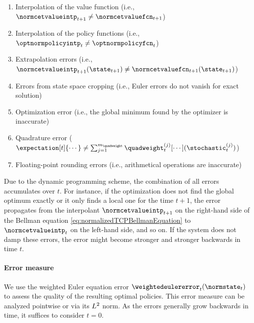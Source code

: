 \begin{enumerate}[label=E\arabic*.,ref=E\arabic*,leftmargin=2.7em]
  \item
  \label{item:financeErrorInterpolationValue}
  Interpolation of the value function
  (i.e., $\normcetvalueintp_{t+1} \not= \normcetvaluefcn_{t+1}$)
  
  \item
  \label{item:financeErrorInterpolationPolicy}
  Interpolation of the policy functions
  (i.e., $\optnormpolicyintp_t \not= \optnormpolicyfcn_t$)
  
  \item
  \label{item:financeErrorExtrapolation}
  Extrapolation errors
  (i.e., $
  \normcetvalueintp_{t+1}(\state_{t+1})
  \not= \normcetvaluefcn_{t+1}(\state_{t+1})
  $)
  
  \item
  \label{item:financeErrorCropping}
  Errors from state space cropping
  (i.e., Euler errors do not vanish for exact solution)
  
  \item
  \label{item:financeErrorOptimization}
  Optimization error
  (i.e., the global minimum found by the optimizer is inaccurate)
  
  \item
  \label{item:financeErrorQuadrature}
  Quadrature error
  ($
  \expectation[t]{\cdots}
  \not= \sum_{j=1}^{m_{\quadweight}} \quadweight_t^{(j)}
  [\cdots](\stochastic_t^{(j)})
  $)
  
  \item
  \label{item:financeErrorRounding}
  Floating-point rounding errors
  (i.e., arithmetical operations are inaccurate)
\end{enumerate}
Due to the dynamic programming scheme,
the combination of all errors accumulates over $t$.
For instance, if the optimization does not find the global optimum
exactly or it only finds a local one for the time $t + 1$,
the error propagates from the interpolant $\normcetvalueintp_{t+1}$
on the right-hand side of the Bellman equation
\eqref{eq:normalizedTCPBellmanEquation} to $\normcetvalueintp_t$
on the left-hand side, and so on.
If the system does not damp these errors,
the error might become stronger and stronger backwards in time $t$.

\paragraph{Error measure}

We use the weighted Euler equation error
$\weightedeulererror_t(\normstate_t)$
to assess the quality of the resulting optimal policies.
This error measure can be analyzed pointwise or
via its $L^2$ norm.
As the errors generally grow backwards in time,
it suffices to consider $t = 0$.




